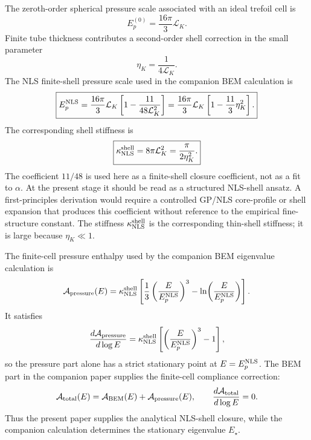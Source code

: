 \documentclass[11pt]{article}
\newcommand{\EpNLS}{E_p^{\rm NLS}}
\newcommand{\kappaNLS}{\kappa_{\rm NLS}^{\rm shell}}
\begin{document}
The zeroth-order spherical pressure scale associated with an ideal trefoil cell is
\begin{equation}
  E_p^{(0)}
  =
  \frac{16\pi}{3}\mathcal L_K.
  \label{eq:Ep0}
\end{equation}
Finite tube thickness contributes a second-order shell correction in the small parameter
\begin{equation}
  \eta_K=\frac{1}{4\mathcal L_K}.
  \label{eq:eta-nls}
\end{equation}
The NLS finite-shell pressure scale used in the companion BEM calculation is
\begin{equation}
  \boxed{
  \EpNLS
  =
  \frac{16\pi}{3}\mathcal L_K
  \left[
  1-\frac{11}{48\mathcal L_K^2}
  \right]
  =
  \frac{16\pi}{3}\mathcal L_K
  \left[
  1-\frac{11}{3}\eta_K^2
  \right].
  }
  \label{eq:EpNLS}
\end{equation}
The corresponding shell stiffness is
\begin{equation}
  \boxed{
  \kappaNLS
  =
  8\pi\mathcal L_K^2
  =
  \frac{\pi}{2\eta_K^2}.
  }
  \label{eq:kappaNLS}
\end{equation}
The coefficient \(11/48\) is used here as a finite-shell closure coefficient, not as a fit to \(\alpha\).  At the present stage it should be read as a structured NLS-shell ansatz.  A first-principles derivation would require a controlled GP/NLS core-profile or shell expansion that produces this coefficient without reference to the empirical fine-structure constant.  The stiffness
\(\kappa_{\rm NLS}^{\rm shell}\) is the corresponding thin-shell stiffness; it is large
because \(\eta_K\ll1\).

The finite-cell pressure enthalpy used by the companion BEM eigenvalue calculation is
\begin{equation}
  \mathcal A_{\rm pressure}(E)
  =
  \kappaNLS
  \left[
    \frac{1}{3}\left(\frac{E}{\EpNLS}\right)^3
    -
    \ln\!\left(\frac{E}{\EpNLS}\right)
  \right].
  \label{eq:pressure-action-nls}
\end{equation}
It satisfies
\begin{equation}
  \frac{d\mathcal A_{\rm pressure}}{d\log E}
  =
  \kappaNLS
  \left[
    \left(\frac{E}{\EpNLS}\right)^3-1
  \right],
  \label{eq:pressure-derivative-nls}
\end{equation}
so the pressure part alone has a strict stationary point at \(E=\EpNLS\).  The BEM part in
the companion paper supplies the finite-cell compliance correction:
\begin{equation}
  \mathcal A_{\rm total}(E)
  =
  \mathcal A_{\rm BEM}(E)
  +
  \mathcal A_{\rm pressure}(E),
  \qquad
  \frac{d\mathcal A_{\rm total}}{d\log E}=0.
  \label{eq:total-action-nls}
\end{equation}
Thus the present paper supplies the analytical NLS-shell closure, while the companion
calculation determines the stationary eigenvalue \(E_\star\).
\end{document}
